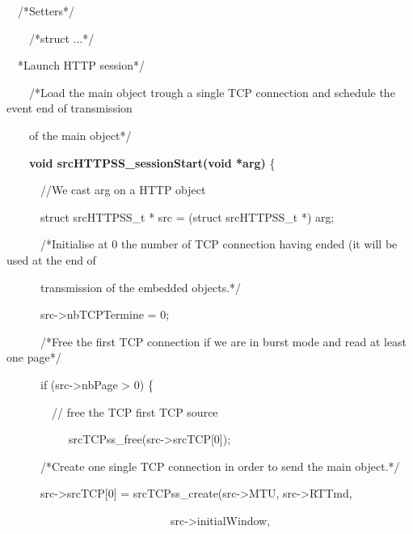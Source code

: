 \documentclass[a4paper]{article}
\begin{document}
\bigskip

{
\ \ /*Setters*/}

{
\ \ \ \ /*struct ...*/}


\bigskip

{
\ \ *Launch HTTP session*/}

{
\ \ \ \ /*Load the main object trough a single TCP connection and schedule the event end of transmission}

{
\ \ \ \ of the main object*/}

{
\ \ \ \ \textbf{void srcHTTPSS\_sessionStart(}\textbf{void *}\textbf{arg)} \{}

\bigskip

{
\ \ \ \ \ \ //We cast arg on a HTTP object}

{
\ \ \ \ \ \ struct srcHTTPSS\_t * src = (struct srcHTTPSS\_t *) arg;}

\bigskip

{
\ \ \ \ \ \ /*Initialise at 0 the number of TCP connection having ended (it will be used at the end of}

{
\ \ \ \ \ \ transmission of the embedded objects.*/}

{
\ \ \ \ \ \ src-{\textgreater}nbTCPTermine = 0;}

\bigskip

{
\ \ \ \ \ \ /*Free the first TCP connection if we are in burst mode and read at least one page*/}

{
\ \ \ \ \ \ if (src-{\textgreater}nbPage {\textgreater} 0) \{}

{
\ \ \ \ \ \ \ \ // free the TCP first TCP source}

{
\ \ \ \ \ \ \ \ \ \ \ srcTCPss\_free(src-{\textgreater}srcTCP[0]);}

\bigskip

{
\ \ \ \ \ \ /*Create one single TCP connection in order to send the main object.*/}

{
\ \ \ \ \ \ src-{\textgreater}srcTCP[0] = srcTCPss\_create(src-{\textgreater}MTU, src-{\textgreater}RTTmd,}

{
\ \ \ \ \ \ \ \ \ \ \ \ \ \ \ \ \ \ \ \ \ \ \ \ \ \ \ \ \ src-{\textgreater}initialWindow,}
\end{document}
